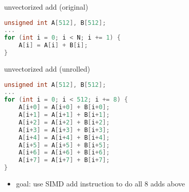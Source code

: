 \begin{frame}[fragile,label=unvectAdd]{unvectorized add (original)}
\begin{lstlisting}[language=C++,style=small]
unsigned int A[512], B[512];
...
for (int i = 0; i < N; i += 1) {
    A[i] = A[i] + B[i];
}
\end{lstlisting}
\end{frame}

\begin{frame}[fragile,label=unvectAddUnrolled]{unvectorized add (unrolled)}
\begin{lstlisting}[language=C++,style=small]
unsigned int A[512], B[512];
...
for (int i = 0; i < 512; i += 8) {
    A[i+0] = A[i+0] + B[i+0];
    A[i+1] = A[i+1] + B[i+1];
    A[i+2] = A[i+2] + B[i+2];
    A[i+3] = A[i+3] + B[i+3];
    A[i+4] = A[i+4] + B[i+4];
    A[i+5] = A[i+5] + B[i+5];
    A[i+6] = A[i+6] + B[i+6];
    A[i+7] = A[i+7] + B[i+7];
}
\end{lstlisting}
\begin{itemize}
\item goal: use SIMD add instruction to do all 8 adds above
\end{itemize}
\end{frame}

